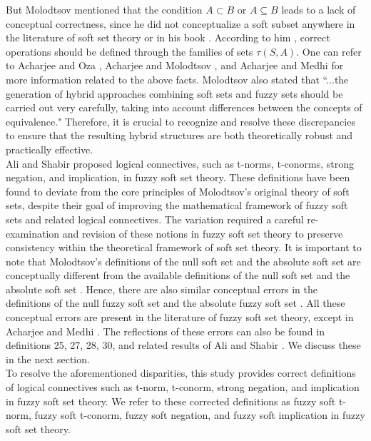\documentclass{article}
\theoremstyle{definition}
\begin{document}
But Molodtsov \cite{3,4} mentioned that the condition $A\subset B$ or $A\subseteq B$ leads to a lack of conceptual correctness, since he did not conceptualize a soft subset anywhere in the literature of soft set theory \cite{1,2,3} or in his book \cite{12}. According to him \cite{2,3,12}, correct operations should be defined through the families of sets $\tau(S,A)$. One can refer to Acharjee and Oza \cite{4}, Acharjee and Molodtsov \cite{9}, and Acharjee and Medhi \cite{10} for more information related to the above facts. Molodtsov \cite{3} also stated that ``...the generation of hybrid approaches combining soft sets and fuzzy sets should be carried out very carefully, taking into account differences between the concepts of equivalence." Therefore, it is crucial to recognize and resolve these discrepancies to ensure that the resulting hybrid structures are both theoretically robust and practically effective.\\

 Ali and Shabir \cite{6} proposed logical connectives, such as t-norms, t-conorms, strong negation, and implication, in fuzzy soft set theory. These definitions have been found to deviate from the core principles of Molodtsov's original theory of soft sets, despite their goal of improving the mathematical framework of fuzzy soft sets and related logical connectives. The variation required a careful re-examination and revision of these notions in fuzzy soft set theory to preserve consistency within the theoretical framework of soft set theory. It is important to note that Molodtsov's definitions of the null soft set \cite{2} and the absolute soft set \cite{3} are conceptually different from the available definitions of the null soft set \cite{11} and the absolute soft set \cite{11}. Hence, there are also similar conceptual errors in the definitions of the null fuzzy soft set \cite{11} and the absolute fuzzy soft set \cite{11}. All these conceptual errors are present in the literature of fuzzy soft set theory, except in Acharjee and Medhi \cite{10}. The reflections of these errors can also be found in definitions 25, 27, 28, 30, and related results of Ali and Shabir \cite{6}. We discuss these in the next section.\\


To resolve the aforementioned disparities, this study provides correct definitions of logical connectives such as t-norm, t-conorm, strong negation, and implication in fuzzy soft set theory. We refer to these corrected definitions as fuzzy soft t-norm, fuzzy soft t-conorm, fuzzy soft negation, and fuzzy soft implication in fuzzy soft set theory.\\
\end{document}
